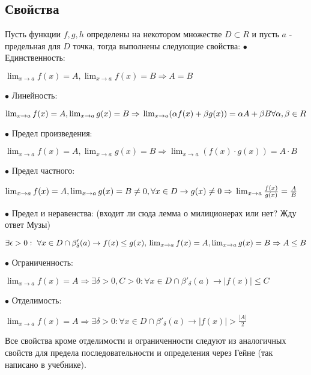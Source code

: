 \documentclass[12pt]{article}
\theoremstyle{definition}
\begin{document}
\subsection{Свойства}
Пусть функции $f, g, h$ определены на некотором множестве $D \subset R$ и пусть $a$ - предельная для $D$ точка, тогда выполнены следующие свойства:\newline
$\bullet$ Единственность:
\begin{center}
$\lim_{x \to a} f(x) = A, \lim_{x \to a} f(x) = B \Rightarrow A  = B$
\end{center}
$\bullet$ Линейность:
\begin{center}
$\lim_{x \to a} f(x) = A, \lim_{x \to a} g(x) = B \Rightarrow \\\lim_{x \to a} (\alpha f(x) + \beta g(x) ) = \alpha A + \beta B \ \\ \forall \alpha, \beta \in R$
\end{center}
$\bullet$ Предел произведения:
\begin{center}
$\lim_{x \to a} f(x) = A, \lim_{x \to a} g(x) = B \Rightarrow \lim_{x \to a} (f(x) \cdot g(x)) = A \cdot B$
\end{center}
$\bullet$ Предел частного:
\begin{center}
$\lim_{x \to a} f(x) = A, \lim_{x \to a} g(x) = B \not = 0, \forall x \in D \to g(x) \not = 0 \Rightarrow \\
\lim_{x \to a} \frac{f(x)}{g(x)} = \frac{A}{B}$
\end{center}
$\bullet$ Предел и неравенства: (входит ли сюда лемма о милиционерах или нет? Жду ответ Музы)
\begin{center}
$\exists \epsilon  > 0: \  \forall x \in D \cap \beta'_{\delta}(a) \to  f(x) \leq g(x), \\ \lim_{x \to a} f(x) = A, \lim_{x \to a} g(x) = B \Rightarrow \\A \leq B$
\end{center}
$\bullet$ Ограниченность:
\begin{center}
$\lim_{x \to a} f(x) = A \Rightarrow \exists \delta > 0, C > 0: \forall x \in D \cap \beta'_{\delta}(a)  \to |f(x)| \leq C $
\end{center}
$\bullet$ Отделимость:
\begin{center}
$\lim_{x \to a} f(x) = A \Rightarrow \exists \delta > 0: \forall x \in D \cap \beta'_{\delta}(a)  \to |f(x)| > \frac{|A|}{2}$
\end{center}
Все свойства кроме отделимости и ограниченности следуют из аналогичных свойств для предела последовательности и определения через Гейне (так написано в учебнике).\newline
\end{document}
